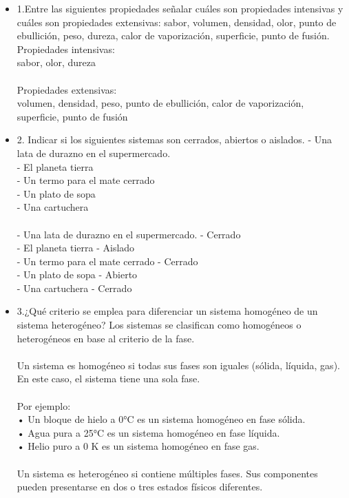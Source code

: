 \documentclass{article}
\begin{document}
\begin{itemize}
\item{1.Entre las siguientes propiedades señalar cuáles son propiedades intensivas y cuáles son propiedades extensivas: sabor, volumen, densidad, olor, punto de ebullición, peso, dureza, calor de vaporización, superficie, punto de fusión.}
Propiedades intensivas:\\
sabor, olor, dureza\\
\\
Propiedades extensivas:\\
volumen, densidad, peso, punto de ebullición, calor de vaporización, superficie, punto de fusión\\

\item{2. Indicar si los siguientes sistemas son cerrados, abiertos o aislados.}
- Una lata de durazno en el supermercado.\\
- El planeta tierra\\
- Un termo para el mate cerrado\\
- Un plato de sopa\\
- Una cartuchera\\
\\
- Una lata de durazno en el supermercado. - Cerrado\\
- El planeta tierra - Aislado\\
- Un termo para el mate cerrado - Cerrado\\
- Un plato de sopa - Abierto\\
- Una cartuchera - Cerrado\\
\item{3.¿Qué criterio se emplea para diferenciar un sistema homogéneo de un sistema heterogéneo? }
Los sistemas se clasifican como homogéneos o heterogéneos en base al criterio de la fase.\\
\\
Un sistema es homogéneo si todas sus fases son iguales (sólida, líquida, gas). En este caso, el sistema tiene una sola fase.\\
\\
Por ejemplo:\\
• Un bloque de hielo a 0°C es un sistema homogéneo en fase sólida.\\
• Agua pura a 25°C es un sistema homogéneo en fase líquida.\\
• Helio puro a 0 K es un sistema homogéneo en fase gas.\\
\\
Un sistema es heterogéneo si contiene múltiples fases. Sus componentes pueden presentarse en dos o tres estados físicos diferentes.\\

\end{itemize}
\end{document}

